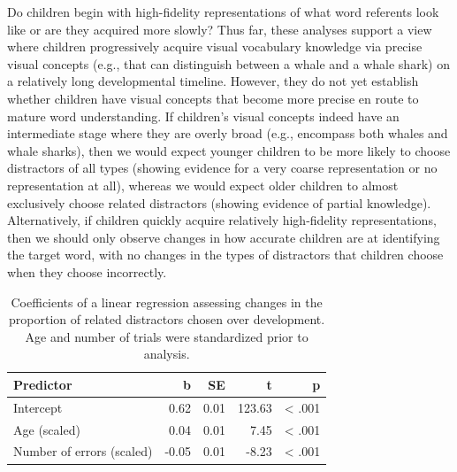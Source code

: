 \documentclass[
  man,mask]{apa6}
\begin{document}
Do children begin with high-fidelity representations of what word referents look like or are they acquired more slowly? Thus far, these analyses support a view where children progressively acquire visual vocabulary knowledge via precise visual concepts (e.g., that can distinguish between a whale and a whale shark) on a relatively long developmental timeline. However, they do not yet establish whether children have visual concepts that become more precise en route to mature word understanding. If children's visual concepts indeed have an intermediate stage where they are overly broad (e.g., encompass both whales and whale sharks), then we would expect younger children to be more likely to choose distractors of all types (showing evidence for a very coarse representation or no representation at all), whereas we would expect older children to almost exclusively choose related distractors (showing evidence of partial knowledge). Alternatively, if children quickly acquire relatively high-fidelity representations, then we should only observe changes in how accurate children are at identifying the target word, with no changes in the types of distractors that children choose when they choose incorrectly.

\begin{table}
\centering
\caption{\label{tab:unnamed-chunk-20}Coefficients of a linear regression assessing changes in the proportion of related distractors chosen over development. Age and number of trials were standardized prior to analysis.}
\centering
\begin{tabular}[t]{lrrrr}
\toprule
Predictor & b & SE & t & p\\
\midrule
Intercept & 0.62 & 0.01 & 123.63 & < .001\\
Age (scaled) & 0.04 & 0.01 & 7.45 & < .001\\
Number of errors (scaled) & -0.05 & 0.01 & -8.23 & < .001\\
\bottomrule
\end{tabular}
\end{table}
\end{document}
